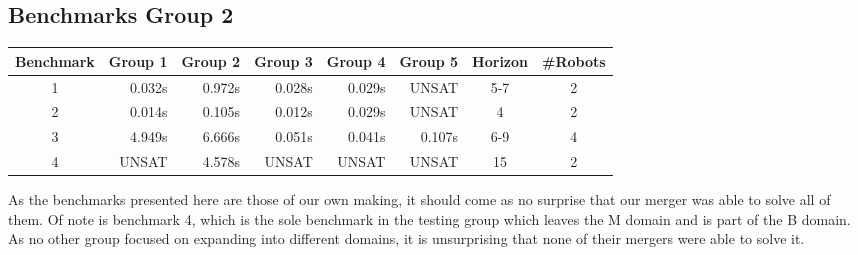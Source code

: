 \documentclass{llncs}
\begin{document}
\subsection{ Benchmarks Group 2}
\begin{table}[]
\begin{tabular}{|c|r|r|r|r|r|c|c|}
\hline
\multicolumn{1}{|l|}{Benchmark} & \multicolumn{1}{l|}{Group 1} & \multicolumn{1}{l|}{Group 2} & \multicolumn{1}{l|}{Group 3} & \multicolumn{1}{l|}{Group 4} & \multicolumn{1}{l|}{Group 5} & Horizon & \multicolumn{1}{l|}{\#Robots} \\ \hline
1                               & 0.032s                  & 0.972s                   & 0.028s                  & 0.029s                  & UNSAT                   & 5-7     & 2                             \\ \hline
2                               & 0.014s                  & 0.105s                  & 0.012s                  & 0.029s                  & UNSAT                   & 4       & 2                             \\ \hline
3                               & 4.949s                  & 6.666s                  & 0.051s                  & 0.041s                  & 0.107s                  & 6-9     & 4                             \\ \hline
4                               & UNSAT                   & 4.578s                  & UNSAT                   & UNSAT                   & UNSAT                   & 15      & 2                             \\ \hline
\end{tabular}
\end{table}
As the benchmarks presented here are those of our own making, it should come as no surprise that our merger was able to solve all of them. Of note is benchmark 4, which is the sole benchmark in the testing group which leaves the M domain and is part of the B domain. As no other group focused on expanding into different domains, it is unsurprising that none of their mergers were able to solve it.
\end{document}
